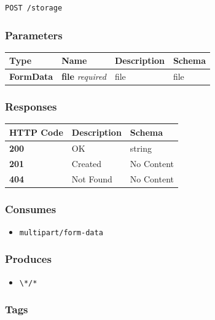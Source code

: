 \begin{verbatim}
POST /storage
\end{verbatim}

\subsubsection{Parameters}\label{parameters-13}

\begin{longtable}[]{@{}llll@{}}
\toprule
Type & Name & Description & Schema\tabularnewline
\midrule
\endhead
\textbf{FormData} & \textbf{file} \emph{required} & file &
file\tabularnewline
\bottomrule
\end{longtable}

\subsubsection{Responses}\label{responses-15}

\begin{longtable}[]{@{}lll@{}}
\toprule
HTTP Code & Description & Schema\tabularnewline
\midrule
\endhead
\textbf{200} & OK & string\tabularnewline
\textbf{201} & Created & No Content\tabularnewline
\textbf{404} & Not Found & No Content\tabularnewline
\bottomrule
\end{longtable}

\subsubsection{Consumes}\label{consumes-8}

\begin{itemize}
\tightlist
\item
  \texttt{multipart/form-data}
\end{itemize}

\subsubsection{Produces}\label{produces-15}

\begin{itemize}
\tightlist
\item
  \texttt{\textbackslash{}*/*}
\end{itemize}

\subsubsection{Tags}\label{tags-15}

